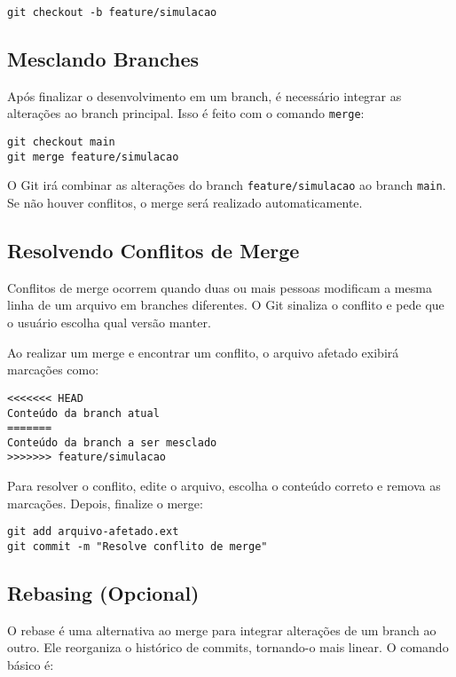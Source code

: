 \begin{lstlisting}[style=shellstyle]
git checkout -b feature/simulacao
\end{lstlisting}

\subsection{Mesclando Branches}

Após finalizar o desenvolvimento em um branch, é necessário integrar as alterações ao branch principal. Isso é feito com o comando \texttt{merge}:

\begin{lstlisting}[style=shellstyle]
git checkout main
git merge feature/simulacao
\end{lstlisting}

O Git irá combinar as alterações do branch \texttt{feature/simulacao} ao branch \texttt{main}. Se não houver conflitos, o merge será realizado automaticamente.

\subsection{Resolvendo Conflitos de Merge}

Conflitos de merge ocorrem quando duas ou mais pessoas modificam a mesma linha de um arquivo em branches diferentes. O Git sinaliza o conflito e pede que o usuário escolha qual versão manter.

Ao realizar um merge e encontrar um conflito, o arquivo afetado exibirá marcações como:

\begin{verbatim}
<<<<<<< HEAD
Conteúdo da branch atual
=======
Conteúdo da branch a ser mesclado
>>>>>>> feature/simulacao
\end{verbatim}

Para resolver o conflito, edite o arquivo, escolha o conteúdo correto e remova as marcações. Depois, finalize o merge:

\begin{lstlisting}[style=shellstyle]
git add arquivo-afetado.ext
git commit -m "Resolve conflito de merge"
\end{lstlisting}

\subsection{Rebasing (Opcional)}

O rebase é uma alternativa ao merge para integrar alterações de um branch ao outro. Ele reorganiza o histórico de commits, tornando-o mais linear. O comando básico é:

